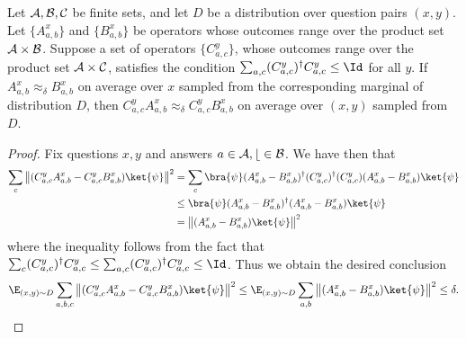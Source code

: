 \begin{fact}
\hypertarget{000U}{}
\reversemarginpar{}
  \label{fact:add-a-proj}
  Let $\cal{A},\cal{B},\cal{C}$ be finite sets, and let $D$ be a distribution
  over question pairs $(x,y)$.
  Let $\{A_{a,b}^x\}$ and $\{B_{a,b}^x\}$ be operators whose outcomes range over the
  product set $\cal{A} \times \cal{B}$.
  Suppose a set of operators $\{C_{a,c}^y\}$, whose outcomes range over the
  product set $\cal{A} \times \cal{C}$, satisfies the condition $\sum_{a,c}
  (C_{a,c}^y)^\dagger C_{a,c}^y \leq \Id$ for all $y$.
  If $A_{a,b}^x \approx_\delta B_{a,b}^x$ on average over $x$ sampled from the
  corresponding marginal of distribution $D$, then $C^y_{a,c} A^x_{a,b}
  \approx_\delta C^y_{a,c} B^x_{a,b}$ on average over $(x,y)$ sampled from $D$.
\end{fact}
\begin{proof}
  Fix questions $x,y$ and answers $a \in \cal{A},b \in \cal{B}$. We have then that
  \begin{align}
    \sum_{c} \left \| (C^y_{a,c} A^x_{a,b} - C^y_{a,c} B^x_{a,b} ) \ket{\psi} \right \|^2
    & = \sum_{c} \bra{\psi} (A^x_{a,b} - B^x_{a,b})^\dagger (C^y_{a,c})^\dagger (C^y_{a,c})
      (A^x_{a,b} - B^x_{a,b} ) \ket{\psi}\\
    & \leq \bra{\psi} (A^x_{a,b} - B^x_{a,b})^\dagger
      (A^x_{a,b} - B^x_{a,b} ) \ket{\psi} \\
    & = \left \| (A^x_{a,b} - B^x_{a,b})\ket{\psi} \right \|^2
  \end{align}
  where the inequality follows from the fact that $\sum_c (C_{a,c}^y)^\dagger
  C_{a,c}^y \leq \sum_{a,c} (C_{a,c}^y)^\dagger C_{a,c}^y \leq \Id$.
  Thus we obtain the desired conclusion
  \begin{equation*}
    \E_{(x,y) \sim D} \sum_{a,b,c} \left \| (C^y_{a,c} A^x_{a,b} - C^y_{a,c} B^x_{a,b} )
      \ket{\psi} \right \|^2 	\leq \E_{(x,y) \sim D} \sum_{a,b}
    \left \| (A^x_{a,b} - B^x_{a,b})\ket{\psi} \right \|^2 \leq \delta.
  \end{equation*}
\end{proof}


